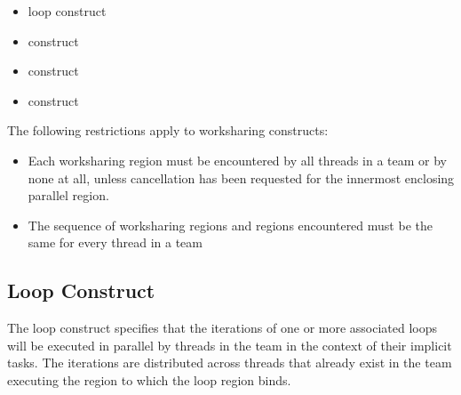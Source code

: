 \begin{itemize}
\item loop construct

\item {} construct

\item {} construct

\item {} construct
\end{itemize}

\begin{samepage}
\restrictions
The following restrictions apply to worksharing constructs:

\begin{itemize}
\item Each worksharing region must be encountered by all threads in a team or by none at 
all, unless cancellation has been requested for the innermost enclosing parallel 
region.

\item The sequence of worksharing regions and  regions encountered must be the 
same for every thread in a team
\end{itemize}
\end{samepage}










\subsection{Loop Construct}
\label{subsec:Loop Construct}
\summary
The loop construct specifies that the iterations of one or more associated loops will be 
executed in parallel by threads in the team in the context of their implicit tasks. The 
iterations are distributed across threads that already exist in the team executing the 
 region to which the loop region binds.

